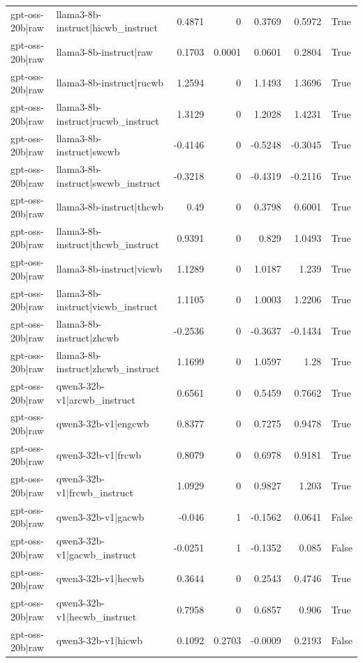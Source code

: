 \begin{table}
\begin{tabular}{l l r r r r l}
gpt-oss-20b|raw & llama3-8b-instruct|hicwb_instruct & 0.4871 & 0 & 0.3769 & 0.5972 & True \\
gpt-oss-20b|raw & llama3-8b-instruct|raw & 0.1703 & 0.0001 & 0.0601 & 0.2804 & True \\
gpt-oss-20b|raw & llama3-8b-instruct|rucwb & 1.2594 & 0 & 1.1493 & 1.3696 & True \\
gpt-oss-20b|raw & llama3-8b-instruct|rucwb_instruct & 1.3129 & 0 & 1.2028 & 1.4231 & True \\
gpt-oss-20b|raw & llama3-8b-instruct|swcwb & -0.4146 & 0 & -0.5248 & -0.3045 & True \\
gpt-oss-20b|raw & llama3-8b-instruct|swcwb_instruct & -0.3218 & 0 & -0.4319 & -0.2116 & True \\
gpt-oss-20b|raw & llama3-8b-instruct|thcwb & 0.49 & 0 & 0.3798 & 0.6001 & True \\
gpt-oss-20b|raw & llama3-8b-instruct|thcwb_instruct & 0.9391 & 0 & 0.829 & 1.0493 & True \\
gpt-oss-20b|raw & llama3-8b-instruct|vicwb & 1.1289 & 0 & 1.0187 & 1.239 & True \\
gpt-oss-20b|raw & llama3-8b-instruct|vicwb_instruct & 1.1105 & 0 & 1.0003 & 1.2206 & True \\
gpt-oss-20b|raw & llama3-8b-instruct|zhcwb & -0.2536 & 0 & -0.3637 & -0.1434 & True \\
gpt-oss-20b|raw & llama3-8b-instruct|zhcwb_instruct & 1.1699 & 0 & 1.0597 & 1.28 & True \\
gpt-oss-20b|raw & qwen3-32b-v1|arcwb_instruct & 0.6561 & 0 & 0.5459 & 0.7662 & True \\
gpt-oss-20b|raw & qwen3-32b-v1|engcwb & 0.8377 & 0 & 0.7275 & 0.9478 & True \\
gpt-oss-20b|raw & qwen3-32b-v1|frcwb & 0.8079 & 0 & 0.6978 & 0.9181 & True \\
gpt-oss-20b|raw & qwen3-32b-v1|frcwb_instruct & 1.0929 & 0 & 0.9827 & 1.203 & True \\
gpt-oss-20b|raw & qwen3-32b-v1|gacwb & -0.046 & 1 & -0.1562 & 0.0641 & False \\
gpt-oss-20b|raw & qwen3-32b-v1|gacwb_instruct & -0.0251 & 1 & -0.1352 & 0.085 & False \\
gpt-oss-20b|raw & qwen3-32b-v1|hecwb & 0.3644 & 0 & 0.2543 & 0.4746 & True \\
gpt-oss-20b|raw & qwen3-32b-v1|hecwb_instruct & 0.7958 & 0 & 0.6857 & 0.906 & True \\
gpt-oss-20b|raw & qwen3-32b-v1|hicwb & 0.1092 & 0.2703 & -0.0009 & 0.2193 & False \\

\end{tabular}
\end{table}
